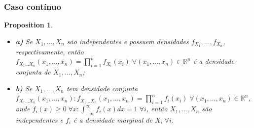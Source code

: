 \documentclass[
]{article}
\providecommand{\tightlist}{%
  \setlength{\itemsep}{0pt}\setlength{\parskip}{0pt}}
\newtheorem{proposition}{Proposition}[section]
\theoremstyle{definition}
\theoremstyle{definition}
\theoremstyle{definition}
\theoremstyle{definition}
\theoremstyle{remark}
\begin{document}
\hypertarget{caso-contuxednuo}{%
\subsubsection{Caso contínuo}\label{caso-contuxednuo}}

\begin{proposition}
\leavevmode

\begin{itemize}
\tightlist
\item
  \textbf{a)} Se \(X_{1},\ldots,X_{n}\) são independentes e possuem densidades \(f_{X_{1}}, \ldots, f_{X_{n}}\), respectivamente, então \(f_{X_{1}\ldots X_{n}}(x_{1},\ldots,x_{n}) = \prod_{i=1}^{n}f_{X_{i}}(x_{i}) \; \forall (x_{1},\ldots,x_{n}) \in \mathbb{R}^{n}\) é a densidade conjunta de \(X_{1},\ldots,X_{n}\);
\item
  \textbf{b)} Se \(X_{1},\ldots,X_{n}\) tem densidade conjunta \(f_{X_{1}\ldots X_{n}}(x_{1},\ldots,x_{n}) : f_{X_{1}\ldots X_{n}}(x_{1},\ldots,x_{n}) = \prod_{i=1}^{n}f_{i}(x_{i}) \; \forall (x_{1},\ldots,x_{n}) \in \mathbb{R}^{n}\), onde \(f_{i}(x) \ge 0 \; \forall x : \int_{-\infty}^{\infty}f_{i}(x)dx = 1 \; \forall i\), então \(X_{1},\ldots,X_{n}\) são independentes e \(f_{i}\) é a densidade marginal de \(X_{i} \; \forall i\).
\end{itemize}

\end{proposition}
\end{document}
